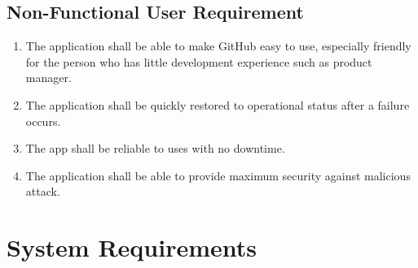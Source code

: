 \documentclass[12pt,a4paper]{report}
\begin{document}
	\subsection{Non-Functional User Requirement}
		\begin{enumerate}
			\renewcommand{\labelenumi}{{\textbf{\arabic{enumi}.}}}
			\item The application shall be able to make GitHub easy to use, especially friendly for the person who has little development experience such as product manager.
			\item The application shall be quickly restored to operational status after a failure occurs.
			\item The app shall be reliable to uses with no downtime.
			\item The application shall be able to provide maximum security against malicious attack.
		\end{enumerate}
\section{System Requirements}
\end{document}
